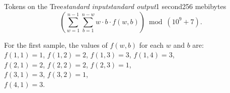 \begin{problem}{Tokens on the Tree}{\textsl{standard input}}{\textsl{standard output}}{1 second}{256 mebibytes}
$$\left(\sum\limits_{w=1}^{n-1}\sum\limits_{b=1}^{n-w} w \cdot b \cdot f(w, b) \right)\bmod (10^9+7)\text{.}$$




\Example

\begin{example}
%
\end{example}

\Note
For the first sample, the values of $f(w,b)$ for each $w$ and $b$ are: \\
$f(1,1)=1$, $f(1,2)=2$, $f(1,3)=3$, $f(1,4)=3$, \\
$f(2,1)=2$, $f(2,2)=2$, $f(2,3)=1$, \\
$f(3,1)=3$, $f(3,2)=1$, \\
$f(4,1)=3$.


\end{problem}

